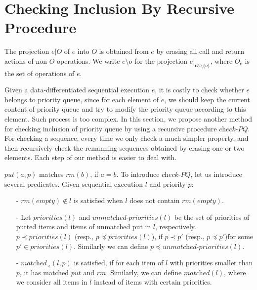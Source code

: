 \section{Checking Inclusion By Recursive Procedure}
\label{sec:checking inclusion by recursive procedure}


 The projection $e \vert{O}$ of $e$ into $O$ is obtained from $e$ by erasing all call and return actions of non-$O$ operations. We write $e \setminus o$ for the projection $e \vert_{ O_e \setminus \{ o \} }$, where $O_e$ is the set of operations of $e$.

Given a data-differentiated sequential execution $e$, it is costly to check whether $e$ belongs to priority queue, since for each element of $e$, we should keep the current content of priority queue and try to modify the priority queue according to this element. Such process is too complex. In this section, we propose another method for checking inclusion of priority queue by using a recursive procedure $\textit{check-PQ}$. For checking a sequence, every time we only check a much simpler property, and then recursively check the remanning sequences obtained by erasing one or two elements. Each step of our method is easier to deal with.

$\textit{put}(a,p)$ matches $\textit{rm}(b)$, if $a = b$. To introduce $\textit{check-PQ}$, let us introduce several predicates. Given sequential execution $l$ and priority $p$:

\begin{itemize}
\setlength{\itemsep}{0.5pt}
\item[-] $\textit{rm}(\textit{empty}) \notin l$ is satisfied when $l$ does not contain $\textit{rm}(\textit{empty})$.

\item[-] Let $\textit{priorities}(l)$ and $\textit{unmatched-priorities}(l)$ be the set of priorities of putted items and items of unmatched put in $l$, respectively. $p \prec \textit{priorities}(l)$ (resp., $p \preceq \textit{priorities}(l)$), if $p \prec p'$ (resp., $p \preceq p'$)for some $p' \in \textit{priorities}(l)$. Similarly we can define $p \preceq \textit{unmatched-priorities}(l)$.

\item[-] $\textit{matched}_{\prec}(l,p)$ is satisfied, if for each item of $l$ with priorities smaller than $p$, it has matched $\textit{put}$ and $\textit{rm}$. Similarly, we can define $\textit{matched}(l)$, where we consider all items in $l$ instead of items with certain priorities.
\end{itemize}

